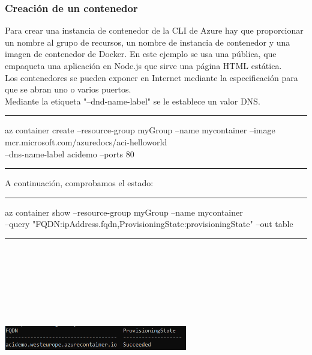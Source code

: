 \documentclass[english,runningheads,a4paper]{llncs}[2018/03/10]
\newenvironment{nscenter}
 {\parskip=0pt\par\nopagebreak\centering}
 {\par\noindent\ignorespacesafterend}
\begin{document}
\subsubsection*{Creación de un contenedor}
Para crear una instancia de contenedor de la CLI de Azure hay que proporcionar 
un nombre al grupo de recursos, un nombre de instancia de contenedor y una 
imagen de contenedor de Docker. En este ejemplo se usa una pública, que 
empaqueta una aplicación en Node.js que sirve una página HTML estática.\\
Los contenedores se pueden exponer en Internet mediante la especificación para 
que se abran uno o varios puertos.\\
Mediante la etiqueta "--dnd-name-label" se le establece un valor DNS.
\begin{nscenter}
\noindent\rule{10cm}{0.4pt}

az container create --resource-group myGroup --name mycontainer 
--image mcr.microsoft.com/azuredocs/aci-helloworld\\ --dns-name-label acidemo 
--ports 80

\noindent\rule{10cm}{0.4pt}
\end{nscenter}
\newline
A continuación, comprobamos el estado:
\newline
\begin{nscenter}
\noindent\rule{10cm}{0.4pt}

az container show --resource-group myGroup --name mycontainer\\ --query 
"{FQDN:ipAddress.fqdn,ProvisioningState:provisioningState}" --out table
\noindent\rule{10cm}{0.4pt}
\end{nscenter}
\newline
\begin{nscenter}
\includegraphics[width=8cm,height=8cm,keepaspectratio]{./Contenedores/Azure/6.png}
\end{nscenter}
\end{document}
